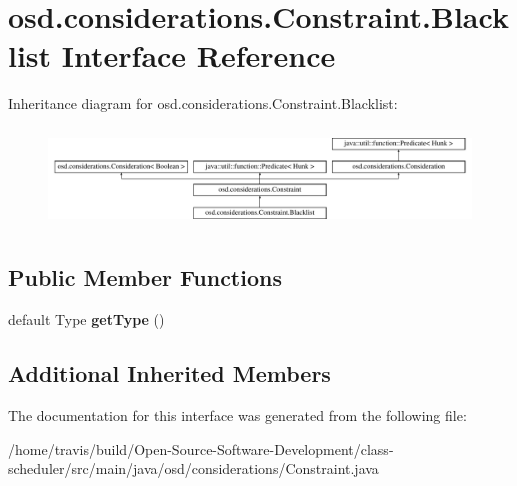 \hypertarget{interfaceosd_1_1considerations_1_1_constraint_1_1_blacklist}{\section{osd.\-considerations.\-Constraint.\-Blacklist Interface Reference}
\label{interfaceosd_1_1considerations_1_1_constraint_1_1_blacklist}
}
Inheritance diagram for osd.\-considerations.\-Constraint.\-Blacklist\-:\begin{figure}[H]
\begin{center}
\leavevmode
\includegraphics[height=2.685851cm]{interfaceosd_1_1considerations_1_1_constraint_1_1_blacklist}
\end{center}
\end{figure}
\subsection*{Public Member Functions}
\begin{DoxyCompactItemize}
\item 
\hypertarget{interfaceosd_1_1considerations_1_1_constraint_1_1_blacklist_a68f09916ef64b4ee2329f079aa4b26ca}{default Type {\bfseries get\-Type} ()}\label{interfaceosd_1_1considerations_1_1_constraint_1_1_blacklist_a68f09916ef64b4ee2329f079aa4b26ca}

\end{DoxyCompactItemize}
\subsection*{Additional Inherited Members}


The documentation for this interface was generated from the following file\-:\begin{DoxyCompactItemize}
\item 
/home/travis/build/\-Open-\/\-Source-\/\-Software-\/\-Development/class-\/scheduler/src/main/java/osd/considerations/Constraint.\-java\end{DoxyCompactItemize}
